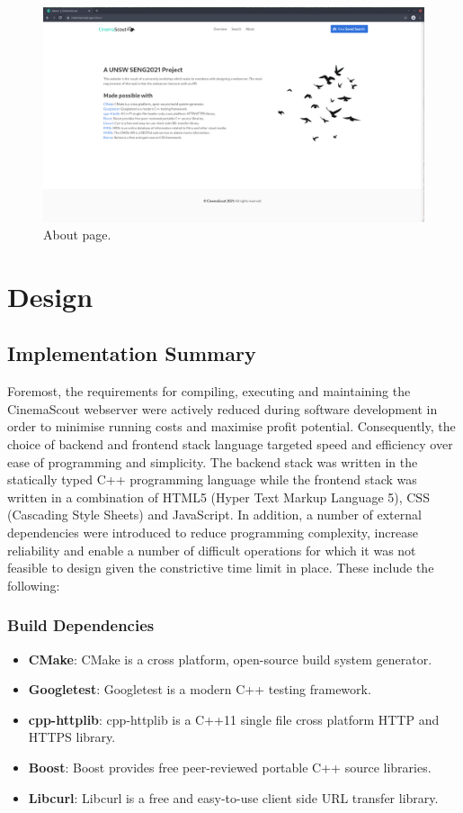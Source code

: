 \documentclass{article}
\begin{document}
\begin{figure}[H]
\includegraphics[width=\columnwidth]{res/about.png}
\caption{About page.}
\end{figure}
\newpage

\section{Design}
\subsection{Implementation Summary}
Foremost, the requirements for compiling, executing and maintaining the
CinemaScout webserver were actively reduced during software development in order
to minimise running costs and maximise profit potential. Consequently, the
choice of backend and frontend stack language targeted speed and efficiency over
ease of programming and simplicity. The backend stack was written in the 
statically typed C++ programming language while the frontend stack was written
in a combination of HTML5 (Hyper Text Markup Language 5), CSS (Cascading Style
Sheets) and JavaScript. In addition, a number of external dependencies were
introduced to reduce programming complexity, increase reliability and enable
a number of difficult operations for which it was not feasible to design given
the constrictive time limit in place. These include the following:
\subsubsection*{Build Dependencies}
\begin{itemize}
\item \textbf{CMake}: CMake is a cross platform, open-source build system
generator.
\item \textbf{Googletest}: Googletest is a modern C++ testing framework.
\item \textbf{cpp-httplib}: cpp-httplib is a C++11 single file cross platform
HTTP and HTTPS library.
\item \textbf{Boost}: Boost provides free peer-reviewed portable C++ source 
libraries.
\item \textbf{Libcurl}: Libcurl is a free and easy-to-use client side URL
transfer library.
\end{itemize}
\end{document}
